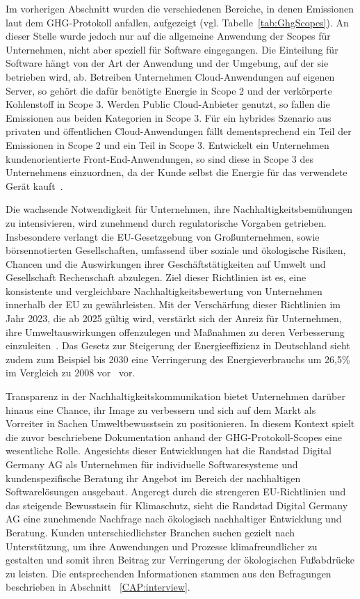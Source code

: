 Im vorherigen Abschnitt wurden die verschiedenen Bereiche, in denen Emissionen laut dem \ac{GHG}-Protokoll anfallen, aufgezeigt (vgl. Tabelle~\ref{tab:GhgScopes}).
An dieser Stelle wurde jedoch nur auf die allgemeine Anwendung der Scopes für Unternehmen, nicht aber speziell für Software eingegangen.
Die Einteilung für Software hängt von der Art der Anwendung und der Umgebung, auf der sie betrieben wird, ab.
Betreiben Unternehmen Cloud-Anwendungen auf eigenen Server, so gehört die dafür benötigte Energie in Scope 2 und der verkörperte Kohlenstoff in Scope 3.
Werden Public Cloud-Anbieter genutzt, so fallen die Emissionen aus beiden Kategorien in Scope 3.
Für ein hybrides Szenario aus privaten und öffentlichen Cloud-Anwendungen fällt dementsprechend ein Teil der Emissionen in Scope 2 und ein Teil in Scope 3.
Entwickelt ein Unternehmen kundenorientierte Front-End-Anwendungen, so sind diese in Scope 3 des Unternehmens einzuordnen, da der Kunde selbst die Energie für das verwendete Gerät kauft~\cite{GreenSoftwareFoundation.2022}.

Die wachsende Notwendigkeit für Unternehmen, ihre Nachhaltigkeitsbemühungen zu intensivieren, wird zunehmend durch regulatorische Vorgaben getrieben.
Insbesondere verlangt die EU-Gesetzgebung von Großunternehmen, sowie börsennotierten Gesellschaften, umfassend über soziale und ökologische Risiken, Chancen und die Auswirkungen ihrer Geschäftstätigkeiten auf Umwelt und Gesellschaft Rechenschaft abzulegen.
Ziel dieser Richtlinien ist es, eine konsistente und vergleichbare Nachhaltigkeitsbewertung von Unternehmen innerhalb der EU zu gewährleisten.
Mit der Verschärfung dieser Richtlinien im Jahr 2023, die ab 2025 gültig wird, verstärkt sich der Anreiz für Unternehmen, ihre Umweltauswirkungen offenzulegen und Maßnahmen zu deren Verbesserung einzuleiten~\cite{DirectorateGeneralforFinancialStability.20240411T13:37:55.000Z}.
Das Gesetz zur Steigerung der Energieeffizienz in Deutschland sieht zudem zum Beispiel bis 2030 eine Verringerung des Energieverbrauchs um 26,5\% im Vergleich zu 2008 vor~\cite{BundesministeriumderJustiz.20240418} vor.

Transparenz in der Nachhaltigkeitskommunikation bietet Unternehmen darüber hinaus eine Chance, ihr Image zu verbessern und sich auf dem Markt als Vorreiter in Sachen Umweltbewusstsein zu positionieren.
In diesem Kontext spielt die zuvor beschriebene Dokumentation anhand der GHG-Protokoll-Scopes eine wesentliche Rolle.
Angesichts dieser Entwicklungen hat die Randstad Digital Germany AG als Unternehmen für individuelle Softwaresysteme und kundenspezifische Beratung ihr Angebot im Bereich der nachhaltigen Softwarelösungen ausgebaut.
Angeregt durch die strengeren EU-Richtlinien und das steigende Bewusstsein für Klimaschutz, sieht die Randstad Digital Germany AG eine zunehmende Nachfrage nach ökologisch nachhaltiger Entwicklung und Beratung.
Kunden unterschiedlichster Branchen suchen gezielt nach Unterstützung, um ihre Anwendungen und Prozesse klimafreundlicher zu gestalten und somit ihren Beitrag zur Verringerung der ökologischen Fußabdrücke zu leisten.
Die entsprechenden Informationen stammen aus den Befragungen beschrieben in Abschnitt ~\ref{CAP:interview}.


